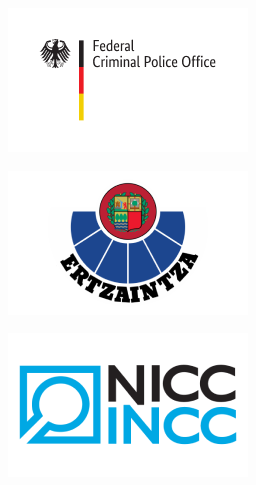 \documentclass{beamer}
\begin{document}
\begin{frame}
{{\begin{minipage}{.15\textwidth}\includegraphics[width=\columnwidth]{../img/logo_bka.png}\end{minipage}%
\begin{minipage}{.15\textwidth}\includegraphics[width=\columnwidth]{../img/logo_ertzaintza.png}\end{minipage}%
\begin{minipage}{.15\textwidth}\includegraphics[width=\columnwidth]{../img/logo_nicc.png}\end{minipage}%

}}
\end{frame}
\end{document}
